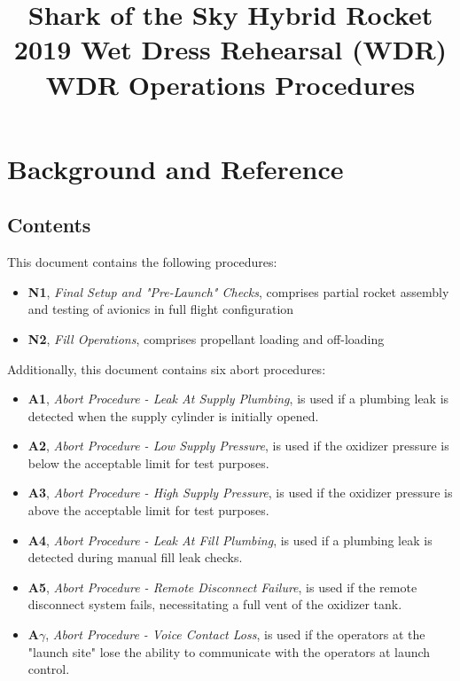 

\title{
\Huge Shark of the Sky Hybrid Rocket\\
2019 Wet Dress Rehearsal (WDR)\\
\vspace{1cm}
\Large WDR Operations Procedures}





\section{Background and Reference}

\subsection{Contents}
This document contains the following procedures:
\begin{itemize}
    \item \textbf{N1}, \textit{Final Setup and "Pre-Launch" Checks}, comprises partial rocket assembly and testing of avionics in full flight configuration
    \item \textbf{N2}, \textit{Fill Operations}, comprises propellant loading and off-loading
\end{itemize}
Additionally, this document contains six abort procedures:
\begin{itemize}
    \item \textbf{A1}, \textit{Abort Procedure - Leak At Supply Plumbing}, is used if a plumbing leak is detected when the supply cylinder is initially opened.
    \item \textbf{A2}, \textit{Abort Procedure - Low Supply Pressure}, is used if the oxidizer pressure is below the acceptable limit for test purposes.
    \item \textbf{A3}, \textit{Abort Procedure - High Supply Pressure}, is used if the oxidizer pressure is above the acceptable limit for test purposes.
    \item \textbf{A4}, \textit{Abort Procedure - Leak At Fill Plumbing}, is used if a plumbing leak is detected during manual fill leak checks.
    \item \textbf{A5}, \textit{Abort Procedure - Remote Disconnect Failure}, is used if the remote disconnect system fails, necessitating a full vent of the oxidizer tank.
    \item \textbf{A\LARGE$\gamma$}, \textit{Abort Procedure - Voice Contact Loss}, is used if the operators at the "launch site" lose the ability to communicate with the operators at launch control.
\end{itemize}

